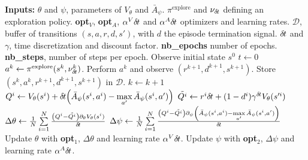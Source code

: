 \begin{algorithmic}
	\STATE \textbf{Inputs:}
	\STATE $\theta$ and $\psi$, parameters of
	$V_{\theta}$ and $\bar{A}_{\psi}$.
	\STATE $\pi^{\text{explore}}$ and $\nu_{\delta\hspace{-.1em}t}$ defining an exploration policy.
	\STATE \textbf{opt}$_V$, \textbf{opt}$_A$, $\alpha^V {\delta\hspace{-.1em}t}$ and $\alpha^A {\delta\hspace{-.1em}t}$ optimizers and learning rates.
	\STATE $\mathcal{D}$, buffer of transitions $(s, a, r, d, s')$, with $d$ the episode termination signal.
	\STATE ${\delta\hspace{-.1em}t}$ and $\gamma$, time discretization and discount factor.
	\STATE \textbf{nb\_epochs} number of epochs.
	\STATE \textbf{nb\_steps}, number of steps per epoch.
	\STATE
	\STATE Observe initial state $s^0$
	\STATE $t \gets 0$
	\STATE $a^k \leftarrow \pi^{\text{explore}}(s^k, \nu^k_{\delta\hspace{-.1em}t})$.
	\STATE Perform $a^k$ and observe $(r^{k+1}, d^{k+1}, s^{k+1})$.
	\STATE Store $(s^k, a^k, r^{k+1}, d^{k+1}, s^{k+1})$ in $\mathcal{D}$.
	\STATE $k \gets k + 1$
	\ENDFOR
	\STATE {}
	\STATE $Q^i \gets V_{\theta}(s^i) + {\delta\hspace{-.1em}t}\hspace{-.17em}\left(
	\bar{A}_{\psi}(s^i, a^i) - \max\limits_{a'}\bar{A}_{\psi}(s^i, a')\right)$
	\STATE $\tilde{Q^i} \gets r^i{\delta\hspace{-.1em}t} + (1 - d^i) \gamma^{{\delta\hspace{-.1em}t}} V_{\theta}(s'^i)$
	\STATE $\Delta \theta \gets \frac{1}{N}\sum\limits_{i=1}^N  \frac{\left(Q^i - \tilde{Q^i}\right)\partial_{\theta} V_{\theta}(s^i)}{{\delta\hspace{-.1em}t}}$
	\STATE $\Delta \psi \gets \frac{1}{N}\sum\limits_{i=1}^N \frac{\left(Q^i - \tilde{Q^i}\right)\partial_{\psi} \left(\bar{A}_{\psi}(s^i, a^i) - \max\limits_{a'}\bar{A}_{\psi}(s^i, a')\right) }{{\delta\hspace{-.1em}t}}$
	\STATE Update $\theta$ with \textbf{opt}$_1$, $\Delta \theta$ and learning rate $\alpha^V {\delta\hspace{-.1em}t}$.
	\STATE Update $\psi$ with \textbf{opt}$_2$, $\Delta \psi$ and learning rate $\alpha^A {\delta\hspace{-.1em}t}$.
	\ENDFOR
	\ENDFOR
\end{algorithmic}
